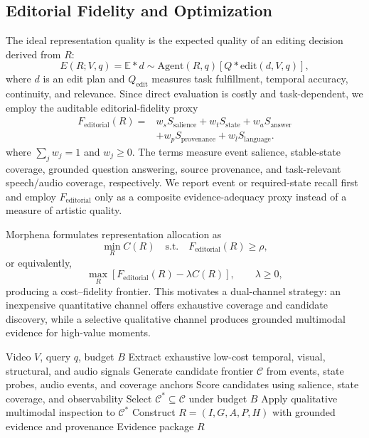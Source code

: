 \documentclass[conference]{IEEEtran}
\begin{document}
\subsection{Editorial Fidelity and Optimization}

The ideal representation quality is the expected quality of an editing decision derived from $R$:
\begin{equation}
E(R;V,q)=
\mathbb{E}*{d\sim\mathrm{Agent}(R,q)}
\left[Q*{\mathrm{edit}}(d,V,q)\right],
\end{equation}
where $d$ is an edit plan and $Q_{\mathrm{edit}}$ measures task fulfillment, temporal accuracy, continuity, and relevance. Since direct evaluation is costly and task-dependent, we employ the auditable editorial-fidelity proxy
\begin{equation}
\begin{aligned}
F_{\mathrm{editorial}}(R)={}&w_sS_{\mathrm{salience}}+w_tS_{\mathrm{state}}+w_aS_{\mathrm{answer}}\\
&+w_pS_{\mathrm{provenance}}+w_lS_{\mathrm{language}}.
\end{aligned}
\label{eq:fidelity}
\end{equation}
where $\sum_jw_j=1$ and $w_j\geq0$. The terms measure event salience, stable-state coverage, grounded question answering, source provenance, and task-relevant speech/audio coverage, respectively. We report event or required-state recall first and employ $F_{\mathrm{editorial}}$ only as a composite evidence-adequacy proxy instead of a measure of artistic quality.

Morphena formulates representation allocation as
\begin{equation}
\min_R C(R)
\quad\text{s.t.}\quad
F_{\mathrm{editorial}}(R)\geq\rho,
\end{equation}
or equivalently,
\begin{equation}
\max_R\left[F_{\mathrm{editorial}}(R)-\lambda C(R)\right],
\qquad \lambda\geq0,
\end{equation}
producing a cost--fidelity frontier. This motivates a dual-channel strategy: an inexpensive quantitative channel offers exhaustive coverage and candidate discovery, while a selective qualitative channel produces grounded multimodal evidence for high-value moments.

\begin{algorithm}[t]
\caption{Morphena Budgeted Evidence Construction}
\label{alg:morphena}
\begin{algorithmic}[1]
\REQUIRE Video $V$, query $q$, budget $B$
\STATE Extract exhaustive low-cost temporal, visual, structural, and audio signals
\STATE Generate candidate frontier $\mathcal{C}$ from events, state probes, audio events, and coverage anchors
\STATE Score candidates using salience, state coverage, and observability
\STATE Select $\mathcal{C}^{*}\subseteq\mathcal{C}$ under budget $B$
\STATE Apply qualitative multimodal inspection to $\mathcal{C}^{*}$
\STATE Construct $R=(I,G,A,P,H)$ with grounded evidence and provenance
\RETURN Evidence package $R$
\end{algorithmic}
\end{algorithm}
\end{document}

